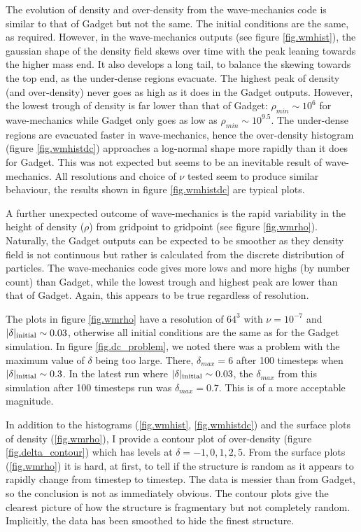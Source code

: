 The evolution of density and over-density from the wave-mechanics code is similar to that of Gadget but not the same. The initial conditions are the same, as required. However, in the wave-mechanics outputs (see figure \ref{fig.wmhist}), the gaussian shape of the density field skews over time with the peak leaning towards the higher mass end. It also develops a long tail, to balance the skewing towards the top end, as the under-dense regions evacuate. The highest peak of density (and over-density) never goes as high as it does in the Gadget outputs. However, the lowest trough of density is far lower than that of Gadget: $\rho_{min} \sim 10^6$ for wave-mechanics while Gadget only goes as low as $\rho_{min} \sim 10^{9.5}$. The under-dense regions are evacuated faster in wave-mechanics, hence the over-density histogram (figure \ref{fig.wmhistdc}) approaches a log-normal shape more rapidly than it does for Gadget. This was not expected but seems to be an inevitable result of wave-mechanics. All resolutions and choice of $\nu$ tested seem to produce similar behaviour, the results shown in figure \ref{fig.wmhistdc} are typical plots.

A further unexpected outcome of wave-mechanics is the rapid variability in the height of density ($\rho$) from gridpoint to gridpoint (see figure \ref{fig.wmrho}). Naturally, the Gadget outputs can be expected to be smoother as they density field is not continuous but rather is calculated from the discrete distribution of particles. The wave-mechanics code gives more lows and more highs (by number count) than Gadget, while the lowest trough and highest peak are lower than that of Gadget. Again, this appears to be true regardless of resolution.

The plots in figure \ref{fig.wmrho} have a resolution of $64^3$ with $\nu = 10^{-7}$ and $|\delta|_{\rm initial} \sim 0.03$, otherwise all initial conditions are the same as for the Gadget simulation. In figure \ref{fig.dc_problem}, we noted there was a problem with the maximum value of $\delta$ being too large. There, $\delta_{max} = 6$ after 100 timesteps when $|\delta|_{\rm initial} \sim 0.3$. In the latest run where $|\delta|_{\rm initial} \sim 0.03$, the $\delta_{max}$ from this simulation after 100 timesteps run was $\delta_{max} = 0.7$. This is of a more acceptable magnitude.

In addition to the histograms (\ref{fig.wmhist}, \ref{fig.wmhistdc}) and the surface plots of density (\ref{fig.wmrho}), I provide a contour plot of over-density (figure \ref{fig.delta_contour}) which has levels at $\delta =  -1, 0, 1, 2, 5$. From the surface plots (\ref{fig.wmrho}) it is hard, at first, to tell if the structure is random as it appears to rapidly change from timestep to timestep. The data is messier than from Gadget, so the conclusion is not as immediately obvious. The contour plots give the clearest picture of how the structure is fragmentary but not completely random. Implicitly, the data has been smoothed to hide the finest structure.

